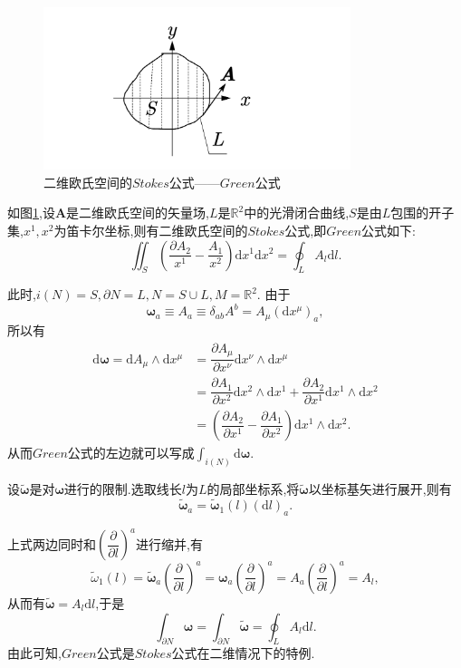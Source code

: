 \begin{remark}
\begin{figure}[htbp]
    \centering
 \includegraphics[width=0.8\textwidth]{Pictures/5-4.png}
    \caption{二维欧氏空间的$Stokes$公式——$Green$公式}
    \label{fig:5-4}
\end{figure}
如图\ref{fig:5-4},设$\boldsymbol{A}$是二维欧氏空间的矢量场,$L$是$\mathbb{R}^2$中的光滑闭合曲线,$S$是由$L$包围的开子集,$x^1,x^2$为笛卡尔坐标,则有二维欧氏空间的$Stokes$公式,即$Green$公式如下:
$$
\iint_S\left(\dfrac{\partial A_2}{x^1}-\dfrac{A_1}{x^2}\right)\mathrm{d}x^1\mathrm{d}x^2=\oint_LA_l\mathrm{d}l.$$

此时,$i(N)=S,\partial N=L,N=S\cup L,M=\mathbb{R}^2.$
由于$$\boldsymbol{\omega}_a\equiv A_a\equiv \delta_{ab}A^b=A_\mu(\mathrm{d}x^\mu)_a,$$
所以有
$$
\begin{aligned}
\mathrm{d}\boldsymbol{\omega}=\mathrm{d}A_\mu\wedge\mathrm{d}x^\mu
&=\dfrac{\partial A_\mu}{\partial x^\nu}\mathrm{d}x^\nu\wedge \mathrm{d}x^\mu\\
&=\dfrac{\partial A_1}{\partial x^2}\mathrm{d}x^2\wedge \mathrm{d}x^1+\dfrac{\partial A_2}{\partial x^1}\mathrm{d}x^1\wedge \mathrm{d}x^2\\
&=\left(\dfrac{\partial A_2}{\partial x^1}-\dfrac{\partial A_1}{\partial x^2}\right)\mathrm{d}x^1\wedge \mathrm{d}x^2.
\end{aligned}
$$
从而$Green$公式的左边就可以写成$\displaystyle\int_{i(N)}\mathrm{d}\boldsymbol{\omega}.$

设$\tilde{\boldsymbol{\omega}}$是对$\boldsymbol{\omega}$进行的限制.选取线长$l$为$L$的局部坐标系,将$\tilde{\boldsymbol{\omega}}$以坐标基矢进行展开,则有
$$\tilde{\boldsymbol{\omega}}_a=\tilde{\boldsymbol{\omega}}_1(l)(\mathrm{d}l)_a.$$

上式两边同时和$\left(\dfrac{\partial}{\partial l}\right)^a$进行缩并,有
$$
\tilde{\omega}_1(l)=\tilde{\boldsymbol{\omega}}_a\left(\dfrac{\partial}{\partial l}\right)^a=\boldsymbol{\omega}_a\left(\dfrac{\partial}{\partial l}\right)^a=A_a\left(\dfrac{\partial}{\partial l}\right)^a=A_l,
$$
从而有$\tilde{\boldsymbol{\omega}}=A_l\mathrm{d}l$,于是
$$
\int_{\partial N}\boldsymbol{\omega}=\int_{\partial N}\tilde{\boldsymbol{\omega}}=\oint_{L}A_l\mathrm{d}l.
$$
由此可知,$Green$公式是$Stokes$公式在二维情况下的特例.
\end{remark}
